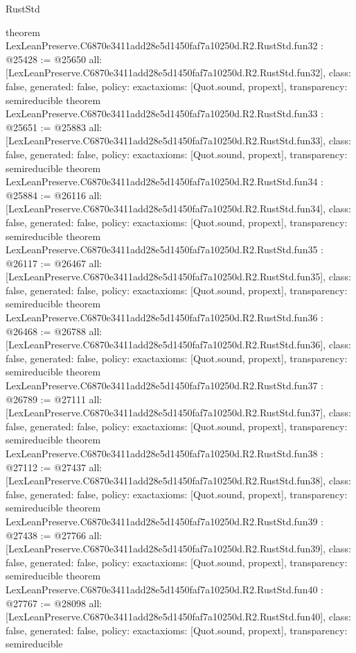 \begin{lexlean}{RustStd}
\begin{coremodule}
{}
theorem LexLeanPreserve.C6870e3411add28e5d1450faf7a10250d.R2.RustStd.fun32 : @25428 := @25650 {
  all: [LexLeanPreserve.C6870e3411add28e5d1450faf7a10250d.R2.RustStd.fun32],
  class: false,
  generated: false,
  policy: exact{axioms: [Quot.sound, propext]},
  transparency: semireducible
}
theorem LexLeanPreserve.C6870e3411add28e5d1450faf7a10250d.R2.RustStd.fun33 : @25651 := @25883 {
  all: [LexLeanPreserve.C6870e3411add28e5d1450faf7a10250d.R2.RustStd.fun33],
  class: false,
  generated: false,
  policy: exact{axioms: [Quot.sound, propext]},
  transparency: semireducible
}
theorem LexLeanPreserve.C6870e3411add28e5d1450faf7a10250d.R2.RustStd.fun34 : @25884 := @26116 {
  all: [LexLeanPreserve.C6870e3411add28e5d1450faf7a10250d.R2.RustStd.fun34],
  class: false,
  generated: false,
  policy: exact{axioms: [Quot.sound, propext]},
  transparency: semireducible
}
theorem LexLeanPreserve.C6870e3411add28e5d1450faf7a10250d.R2.RustStd.fun35 : @26117 := @26467 {
  all: [LexLeanPreserve.C6870e3411add28e5d1450faf7a10250d.R2.RustStd.fun35],
  class: false,
  generated: false,
  policy: exact{axioms: [Quot.sound, propext]},
  transparency: semireducible
}
theorem LexLeanPreserve.C6870e3411add28e5d1450faf7a10250d.R2.RustStd.fun36 : @26468 := @26788 {
  all: [LexLeanPreserve.C6870e3411add28e5d1450faf7a10250d.R2.RustStd.fun36],
  class: false,
  generated: false,
  policy: exact{axioms: [Quot.sound, propext]},
  transparency: semireducible
}
theorem LexLeanPreserve.C6870e3411add28e5d1450faf7a10250d.R2.RustStd.fun37 : @26789 := @27111 {
  all: [LexLeanPreserve.C6870e3411add28e5d1450faf7a10250d.R2.RustStd.fun37],
  class: false,
  generated: false,
  policy: exact{axioms: [Quot.sound, propext]},
  transparency: semireducible
}
theorem LexLeanPreserve.C6870e3411add28e5d1450faf7a10250d.R2.RustStd.fun38 : @27112 := @27437 {
  all: [LexLeanPreserve.C6870e3411add28e5d1450faf7a10250d.R2.RustStd.fun38],
  class: false,
  generated: false,
  policy: exact{axioms: [Quot.sound, propext]},
  transparency: semireducible
}
theorem LexLeanPreserve.C6870e3411add28e5d1450faf7a10250d.R2.RustStd.fun39 : @27438 := @27766 {
  all: [LexLeanPreserve.C6870e3411add28e5d1450faf7a10250d.R2.RustStd.fun39],
  class: false,
  generated: false,
  policy: exact{axioms: [Quot.sound, propext]},
  transparency: semireducible
}
theorem LexLeanPreserve.C6870e3411add28e5d1450faf7a10250d.R2.RustStd.fun40 : @27767 := @28098 {
  all: [LexLeanPreserve.C6870e3411add28e5d1450faf7a10250d.R2.RustStd.fun40],
  class: false,
  generated: false,
  policy: exact{axioms: [Quot.sound, propext]},
  transparency: semireducible
}
\end{coremodule}
\end{lexlean}
